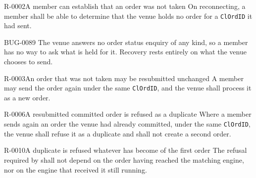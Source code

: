 \begin{requirement}{R-0002}{A member can establish that an order was not taken}
  On reconnecting, a member shall be able to determine that the venue holds no
  order for a \texttt{ClOrdID} it had sent.
\end{requirement}

\begin{gap}{BUG-0089}
  The venue answers no order status enquiry of any kind, so a member has no way
  to ask what is held for it. Recovery rests entirely on what the venue chooses
  to send.
\end{gap}

\begin{requirement}{R-0003}{An order that was not taken may be resubmitted unchanged}
  A member may send the order again under the same \texttt{ClOrdID}, and the
  venue shall process it as a new order.
\end{requirement}

\begin{requirement}{R-0006}{A resubmitted committed order is refused as a duplicate}
  Where a member sends again an order the venue had already committed, under the
  same \texttt{ClOrdID}, the venue shall refuse it as a duplicate and shall not
  create a second order.
\end{requirement}

\begin{requirement}{R-0010}{A duplicate is refused whatever has become of the first order}
  The refusal required by  shall not depend on the order having
  reached the matching engine, nor on the engine that received it still running.
\end{requirement}

